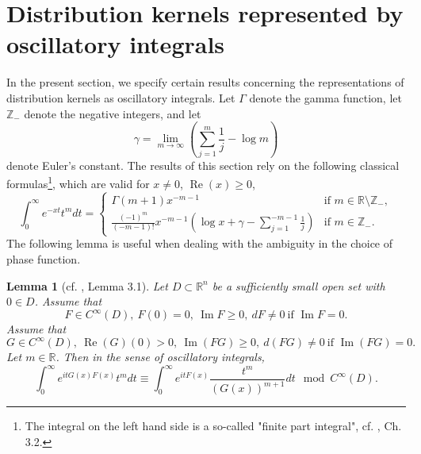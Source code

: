 \documentclass{article}
\newtheorem{lemma}[theorem]{Lemma}
\newcommand{\RR}{\mathbb R}
\newcommand{\ZZ}{\mathbb Z}
\DeclareMathOperator{\re}{Re}
\DeclareMathOperator{\im}{Im}
\begin{document}
\section{Distribution kernels represented by oscillatory integrals}\label{aux_sect}
%
In the present section, we specify certain results concerning the representations of distribution kernels as oscillatory integrals. Let $\Gamma$ denote the gamma function, let $\ZZ_-$ denote the negative integers, and let $$\gamma = \lim_{m \to \infty} \left(\sum_{j=1}^m \frac 1 j - \log m \right)$$ denote Euler's constant. The results of this section rely on the following classical formulas\footnote{The integral on the left hand side is a so-called "finite part integral", cf. \cite{hormander1}, Ch. 3.2.}, which are valid for $x \ne 0$, $\re(x) \ge 0$,
%
\begin{equation}\label{classical_eq}\int_0^\infty e^{-xt} t^m dt = \left\{\begin{array}{ll} \Gamma(m+1) x^{-m-1} & \text{if } m \in \RR \setminus \ZZ_-,\\ \frac{(-1)^m}{(-m-1)!} x^{-m-1} \left(\log x + \gamma -\sum_{j=1}^{-m-1} \frac 1 j \right)& \text{if } m \in \ZZ_-.\end{array}\right.\end{equation}
%
The following lemma is useful when dealing with the ambiguity in the choice of phase function. 
%
\begin{lemma}[cf. \cite{hsiao_shen}, Lemma 3.1]\label{phase_factorization} Let $D \subset \RR^n$ be a sufficiently small open set with $0 \in D$. Assume that $$F \in C^\infty(D),\ F(0) = 0,\ \im F \ge 0,\ dF \ne 0\ \text{if } \im F = 0.$$ Assume that $$G \in C^\infty(D),\ \re(G)(0) > 0,\ \im(FG) \ge 0,\ d(FG) \ne 0\ \text{if } \im(FG) =0.$$ Let $m \in \RR$. Then in the sense of oscillatory integrals, $$\int_0^\infty e^{it G(x) F(x)} t^m dt \equiv \int_0^\infty e^{it F(x)} \frac{t^m}{(G(x))^{m+1}} dt \mod C^\infty(D).$$ \end{lemma}
%
\end{document}
